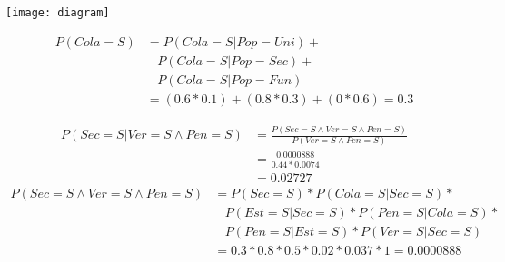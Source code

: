 \documentclass[answers]{exam}
\begin{document}
\begin{questions}
\question
\begin{solution}
\texttt{[image: diagram]}
\end{solution}

\question
\begin{solution}
\begin{align*}
P(Cola=S) &= P(Cola=S|Pop=Uni)+\\
          &\ \ \ \ P(Cola=S|Pop=Sec)+\\
          &\ \ \ \ P(Cola=S|Pop=Fun)\\
          &= (0.6*0.1)+(0.8*0.3)+(0*0.6) = 0.3
\end{align*}
\end{solution}

\question
\begin{solution}
\begin{align*}
P(Sec=S|Ver=S \land Pen=S) &= \frac{P(Sec=S \land Ver=S \land Pen=S)}{P(Ver=S \land Pen=S)}\\
                           &= \frac{0.0000888}{0.44*0.0074}\\
                           &= 0.02727
\end{align*}
\begin{align*}
P(Sec=S \land Ver=S \land Pen=S) &= P(Sec=S)*P(Cola=S|Sec=S)*\\
                                 &\ \ \ \ P(Est=S|Sec=S)*P(Pen=S|Cola=S)*\\
                                 &\ \ \ \ P(Pen=S|Est=S)*P(Ver=S|Sec=S)\\
                                 &= 0.3*0.8*0.5*0.02*0.037*1 = 0.0000888
\end{align*}
\end{solution}
\end{questions}
\end{document}
